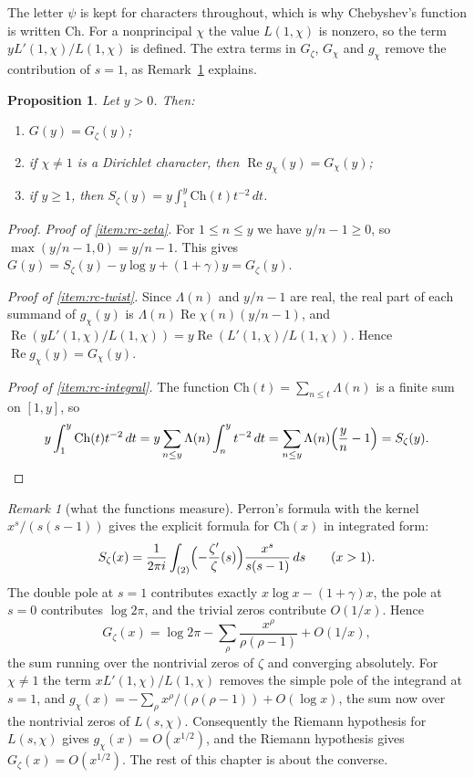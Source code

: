 \documentclass[11pt]{amsbook}
\theoremstyle{plain}
\newtheorem{proposition}[theorem]{Proposition}
\theoremstyle{definition}
\theoremstyle{remark}
\newtheorem{remark}[theorem]{Remark}
\numberwithin{equation}{section}
\numberwithin{figure}{chapter}
\numberwithin{table}{chapter}
\newcommand{\Ch}{\mathrm{Ch}}
\newcommand{\Gz}{G_{\zeta}}
\newcommand{\Sz}{S_{\zeta}}
\begin{document}
The letter $\psi$ is kept for characters throughout, which is why
Chebyshev's function is written $\Ch$. For a nonprincipal $\chi$ the
value $L(1,\chi)$ is nonzero, so the term $yL'(1,\chi)/L(1,\chi)$ is
defined. The extra terms
in $\Gz$, $G_\chi$ and $g_\chi$ remove the contribution of $s=1$, as
Remark~\ref{rem:explicit} explains.

\begin{proposition}\label{prop:realcomplex}
Let $y>0$. Then:
\begin{enumerate}[label=(\alph*)]
\item\label{item:rc-zeta} $G(y)=\Gz(y)$;
\item\label{item:rc-twist} if $\chi\ne1$ is a Dirichlet character,
then $\operatorname{Re}g_\chi(y)=G_\chi(y)$;
\item\label{item:rc-integral} if $y\ge1$, then
$\Sz(y)=y\int_1^y\Ch(t)t^{-2}\,dt$.
\end{enumerate}
\end{proposition}

\begin{proof}
\noindent\emph{Proof of \ref{item:rc-zeta}.}
For $1\le n\le y$ we have $y/n-1\ge0$, so $\max(y/n-1,0)=y/n-1$. This
gives $G(y)=\Sz(y)-y\log y+(1+\gamma)y=\Gz(y)$.

\noindent\emph{Proof of \ref{item:rc-twist}.} Since $\Lambda(n)$ and
$y/n-1$ are real, the real part of each summand of $g_\chi(y)$ is
$\Lambda(n)\operatorname{Re}\chi(n)(y/n-1)$, and
$\operatorname{Re}(yL'(1,\chi)/L(1,\chi))=y\operatorname{Re}
(L'(1,\chi)/L(1,\chi))$. Hence $\operatorname{Re}g_\chi(y)=G_\chi(y)$.

\noindent\emph{Proof of \ref{item:rc-integral}.} The function
$\Ch(t)=\sum_{n\le t}\Lambda(n)$ is a finite sum on $[1,y]$,
so
\[
y\int_1^y\Ch(t)t^{-2}\,dt=y\sum_{n\le y}\Lambda(n)\int_n^y
t^{-2}\,dt
=\sum_{n\le y}\Lambda(n)\Bigl(\frac{y}{n}-1\Bigr)=\Sz(y).\qedhere
\]
\end{proof}

\begin{remark}[what the functions measure]\label{rem:explicit}
Perron's formula with the kernel $x^s/(s(s-1))$ gives the explicit
formula for $\Ch(x)$ \cite{Davenport2000,MontgomeryVaughan2007} in
integrated form:
\[
\Sz(x)=\frac{1}{2\pi i}\int_{(2)}\Bigl(-\frac{\zeta'}{\zeta}(s)\Bigr)
\frac{x^s}{s(s-1)}\,ds\qquad(x>1).
\]
The double pole at $s=1$ contributes exactly $x\log x-(1+\gamma)x$,
the pole at $s=0$ contributes $\log2\pi$, and the trivial zeros
contribute $O(1/x)$. Hence
\[
\Gz(x)=\log2\pi-\sum_\rho\frac{x^\rho}{\rho(\rho-1)}+O(1/x),
\]
the sum running over the nontrivial zeros of $\zeta$ and converging
absolutely. For $\chi\ne1$ the term $xL'(1,\chi)/L(1,\chi)$ removes
the simple pole of the integrand at $s=1$, and
$g_\chi(x)=-\sum_\rho x^\rho/(\rho(\rho-1))+O(\log x)$, the sum now
over the nontrivial zeros of $L(s,\chi)$. Consequently the Riemann
hypothesis for $L(s,\chi)$ gives $g_\chi(x)=O(x^{1/2})$, and the
Riemann hypothesis gives $\Gz(x)=O(x^{1/2})$. The rest of this chapter
is about the converse.
\end{remark}
\end{document}
